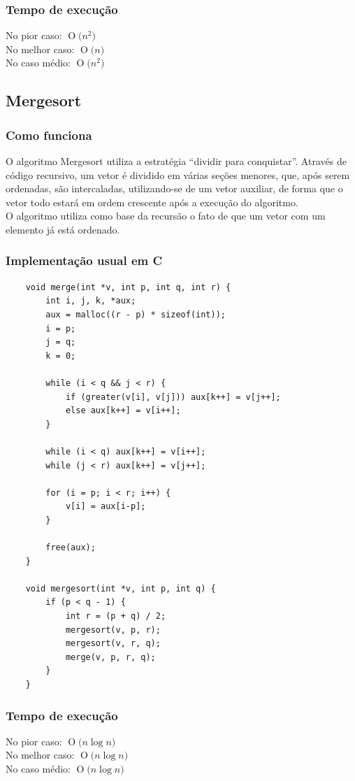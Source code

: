 \documentclass[12pt,a4paper]{article}
\newcommand{\BigO}[1]{\ensuremath{\operatorname{O}\bigl(#1\bigr)}}
\begin{document}
	\subsubsection{Tempo de execução}
	\indent No pior caso: \BigO{n^2}\\
	\indent No melhor caso: \BigO{n}\\
	\indent No caso médio: \BigO{n^2}


	\subsection{Mergesort}

	\subsubsection{Como funciona}
	\indent O algoritmo Mergesort utiliza a estratégia “dividir para conquistar”. Através de código recursivo, um vetor é dividido em várias seções menores, que, após serem ordenadas, são intercaladas, utilizando-se de um vetor auxiliar, de forma que o vetor todo estará em ordem crescente após a execução do algoritmo.\\
	\indent O algoritmo utiliza como base da recursão o fato de que um vetor com um elemento já está ordenado.

	\subsubsection{Implementação usual em C}
	\begin{lstlisting}
	void merge(int *v, int p, int q, int r) {
		int i, j, k, *aux;
		aux = malloc((r - p) * sizeof(int));
		i = p;
		j = q;
		k = 0;

		while (i < q && j < r) {
			if (greater(v[i], v[j])) aux[k++] = v[j++];
			else aux[k++] = v[i++];
		}

		while (i < q) aux[k++] = v[i++];
		while (j < r) aux[k++] = v[j++];
		
		for (i = p; i < r; i++) {
			v[i] = aux[i-p];
		}

		free(aux);
	}

	void mergesort(int *v, int p, int q) {
		if (p < q - 1) {
			int r = (p + q) / 2;
			mergesort(v, p, r);
			mergesort(v, r, q);
			merge(v, p, r, q);
		}
	}
	\end{lstlisting}

	\begin{minipage}{\linewidth}
	\subsubsection{Tempo de execução}
	\indent No pior caso: \BigO{n\log{}n}\\
	\indent No melhor caso: \BigO{n\log{}n}\\
	\indent No caso médio: \BigO{n\log{}n}
	\end{minipage}
\end{document}
